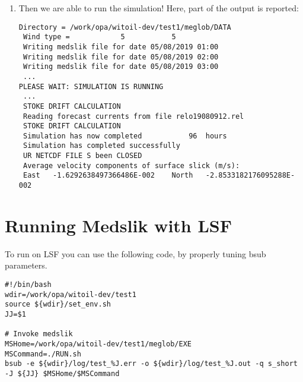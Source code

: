 \begin{enumerate}
\item Then we are able to run the simulation! Here, part of the output is reported:

\begin{lstlisting}
Directory = /work/opa/witoil-dev/test1/meglob/DATA
 Wind type =            5           5
 Writing medslik file for date 05/08/2019 01:00
 Writing medslik file for date 05/08/2019 02:00
 Writing medslik file for date 05/08/2019 03:00
 ...
PLEASE WAIT: SIMULATION IS RUNNING
 ...
 STOKE DRIFT CALCULATION
 Reading forecast currents from file relo19080912.rel
 STOKE DRIFT CALCULATION
 Simulation has now completed           96  hours
 Simulation has completed successfully
 UR NETCDF FILE S been CLOSED
 Average velocity components of surface slick (m/s):
 East   -1.6292638497366486E-002    North   -2.8533182176095288E-002
\end{lstlisting}

\end{enumerate}

\section{Running Medslik with LSF}

To run on LSF you can use the following code, by properly tuning bsub parameters.

\begin{lstlisting}
#!/bin/bash
wdir=/work/opa/witoil-dev/test1
source ${wdir}/set_env.sh
JJ=$1

# Invoke medslik
MSHome=/work/opa/witoil-dev/test1/meglob/EXE
MSCommand=./RUN.sh
bsub -e ${wdir}/log/test_%J.err -o ${wdir}/log/test_%J.out -q s_short -J ${JJ} $MSHome/$MSCommand
\end{lstlisting}

